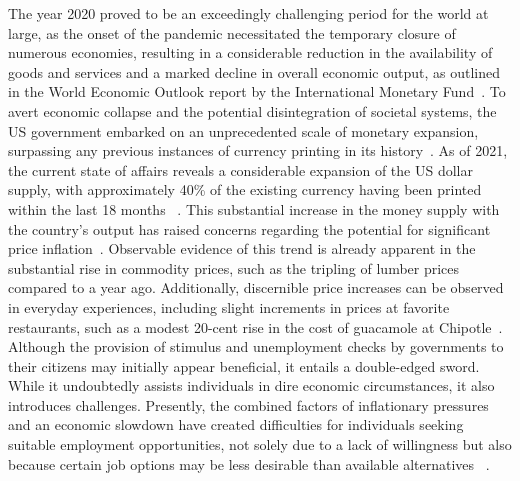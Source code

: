 The year 2020 proved to be an exceedingly challenging period for the world at large, as the onset of the pandemic necessitated
the temporary closure of numerous economies, resulting in a considerable reduction in the availability of goods and services
and a marked decline in overall economic output, as outlined in the World Economic Outlook report by the International
Monetary Fund~\cite{imf2020}. To avert economic collapse and the potential disintegration of societal systems,
the US government embarked on an unprecedented scale of monetary expansion, surpassing any previous instances of currency
printing in its history~\cite{blinder2020}. As of 2021, the current state of affairs reveals a considerable expansion of
the US dollar supply, with approximately 40\% of the existing currency having been printed within the last 18 months
~\cite{fedmoneysupply}. This substantial increase in the money supply with the country's output has raised concerns
regarding the potential for significant price inflation~\cite{Blanchard2021}. Observable evidence of this trend is already
apparent in the substantial rise in commodity prices, such as the tripling of lumber prices compared to a year ago. Additionally,
discernible price increases can be observed in everyday experiences, including slight increments in prices at favorite restaurants,
such as a modest 20-cent rise in the cost of guacamole at Chipotle~\cite{BLS}. Although the provision of stimulus and unemployment
checks by governments to their citizens may initially appear beneficial, it entails a double-edged sword. While it undoubtedly
assists individuals in dire economic circumstances, it also introduces challenges. Presently, the combined factors of inflationary
pressures and an economic slowdown have created difficulties for individuals seeking suitable employment opportunities, not
solely due to a lack of willingness but also because certain job options may be less desirable than available alternatives
~\cite{cbo2020, kahn2020}.

